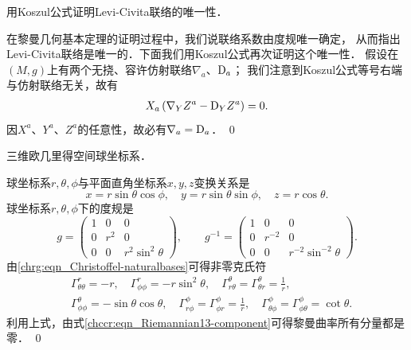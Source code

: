 \begin{example}
	用Koszul公式证明Levi-Civita联络的唯一性．
\end{example}
在黎曼几何基本定理的证明过程中，我们说联络系数由度规唯一确定，
从而指出Levi-Civita联络是唯一的．下面我们用Koszul公式再次证明这个唯一性．
假设在$(M,g)$上有两个无挠、容许仿射联络$\nabla_a$、${\rm D}_a$；
我们注意到Koszul公式等号右端与仿射联络无关，故有
\begin{align*}
	X_a \left(\nabla_Y Z^a - {\rm D}_Y Z^a\right)= 0.
\end{align*}
因$X^a$、$Y^a$、$Z^a$的任意性，故必有$\nabla_a={\rm D}_a$．  \qed



\begin{example}\label{chrg:exm_S3}
    三维欧几里得空间球坐标系．
\end{example}
球坐标系$r,\theta,\phi$与平面直角坐标系$x,y,z$变换关系是
\begin{equation}\label{chrg:eqn_rtpxyz}
    x  = r\sin\theta \cos\phi ,\quad
    y  = r\sin\theta \sin\phi ,\quad
    z  = r\cos\theta .
\end{equation}
球坐标系$r,\theta,\phi$下的度规是
\begin{equation}\label{chgd:eqn_S3gab}
    g=\begin{pmatrix}  
        1 &0 &0 \\ 0& r^2 & 0 \\ 0& 0 & r^2 \sin^2\theta  
    \end{pmatrix} , \qquad
    g^{-1}=\begin{pmatrix}  
        1 &0&0 \\ 0& r^{-2} & 0 \\ 0& 0 & r^{-2} \sin^{-2}\theta  
    \end{pmatrix} .
\end{equation}
由\eqref{chrg:eqn_Christoffel-naturalbases}可得非零克氏符
\begin{equation}\label{chrg:eqn_S3Gamma}
    \begin{aligned}
        &\Gamma^r_{\theta\theta}=-r,\quad \Gamma^r_{\phi\phi}=-r \sin^2\theta,\quad
        \Gamma^\theta_{r\theta}=\Gamma^\theta_{\theta r}=\frac{1}{r}, \\
        & \Gamma^\theta_{\phi\phi}= - \sin \theta \cos\theta ,\quad
        \Gamma^\phi _{r \phi} = \Gamma^\phi _{\phi r}= \frac{1}{r},\quad
        \Gamma^\phi_{\theta\phi}= \Gamma^\phi_{\phi\theta} = \cot \theta .
    \end{aligned}
\end{equation}
利用上式，由式\eqref{chccr:eqn_Riemannian13-component}可得黎曼曲率所有分量都是零．
\qed


